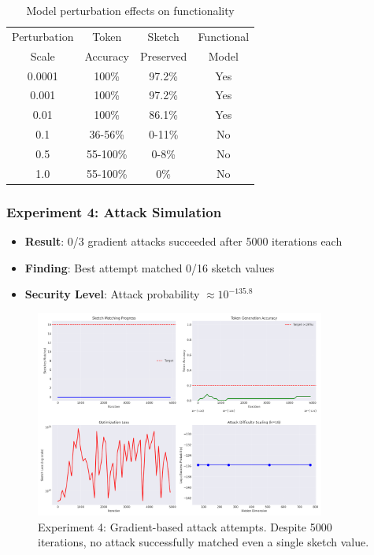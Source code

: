 \documentclass[11pt,a4paper]{article}
\begin{document}
\begin{table}[h]
\centering
\begin{tabular}{|c|c|c|c|}
\hline
Perturbation & Token & Sketch & Functional \\
Scale & Accuracy & Preserved & Model \\
\hline
0.0001 & 100\% & 97.2\% & Yes \\
0.001 & 100\% & 97.2\% & Yes \\
0.01 & 100\% & 86.1\% & Yes \\
0.1 & 36-56\% & 0-11\% & No \\
0.5 & 55-100\% & 0-8\% & No \\
1.0 & 55-100\% & 0\% & No \\
\hline
\end{tabular}
\caption{Model perturbation effects on functionality}
\label{tab:perturbation}
\end{table}

\subsubsection{Experiment 4: Attack Simulation}
\begin{itemize}
    \item \textbf{Result}: 0/3 gradient attacks succeeded after 5000 iterations each
    \item \textbf{Finding}: Best attempt matched 0/16 sketch values
    \item \textbf{Security Level}: Attack probability $\approx 10^{-135.8}$
\end{itemize}

\begin{figure}[ht]
\centering
\includegraphics[width=0.85\textwidth]{experiment_4_attack_analysis.png}
\caption{Experiment 4: Gradient-based attack attempts. Despite 5000 iterations, no attack successfully matched even a single sketch value.}
\label{fig:exp4a}
\end{figure}
\end{document}
